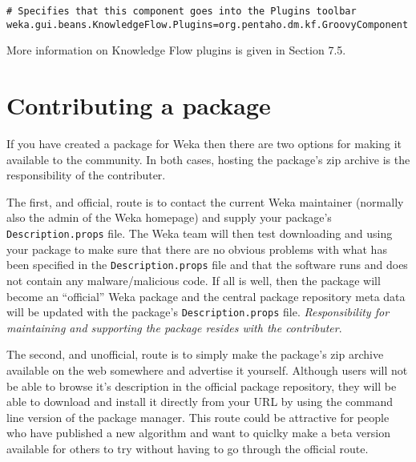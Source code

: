 \begin{verbatim}
# Specifies that this component goes into the Plugins toolbar
weka.gui.beans.KnowledgeFlow.Plugins=org.pentaho.dm.kf.GroovyComponent
\end{verbatim}

More information on Knowledge Flow plugins is given in Section 7.5.

\section{Contributing a package}

If you have created a package for Weka then there are two
options for making it available to the community. In both cases,
hosting the package's zip archive is the responsibility of
the contributer.

The first, and official, route is to contact the current Weka
maintainer (normally also the admin of the Weka homepage) and supply
your package's \texttt{Description.props} file. The Weka team will
then test downloading and using your package to make sure that there
are no obvious problems with what has been specified in the
\texttt{Description.props} file and that the software runs and does
not contain any malware/malicious code. If all is well, then the
package will become an ``official'' Weka package and the central
package repository meta data will be updated with the package's
\texttt{Description.props} file. \textit{Responsibility for
  maintaining and supporting the package resides with the
  contributer}.

The second, and unofficial, route is to simply make the package's zip
archive available on the web somewhere and advertise it
yourself. Although users will not be able to browse it's description
in the official package repository, they will be able to download and
install it directly from your URL by using the command line version of
the package manager. This route could be attractive for people who
have published a new algorithm and want to quiclky make a beta version
available for others to try without having to go through the official
route.

